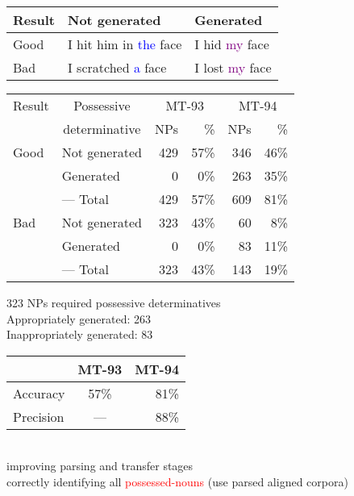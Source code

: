 \documentclass[a4paper,landscape,headrule,footrule,dvips]{foils}
\newcommand{\psp}[1]{\textcolor{purple}{#1}}
\newcommand{\dtr}[1]{\textcolor{blue}{#1}}
\newcommand{\trg}[1]{\textcolor{red}{#1}}
\newcommand{\hsp}{\hspace*{1.5cm}}
\newcommand{\hhsp}{\hspace*{2.5cm}}
\begin{document}
\begin{CJK}{UTF8}{min}
  \begin{center}
    \begin{tabular}{|l|l|l|} \hline
      Result & Not generated & Generated  \\ \hline
      Good &I hit him in \dtr{the} face  &  I hid \psp{my} face \\ \hline
      Bad &  I scratched \dtr{a} face       & I lost \psp{my} face \\ \hline
    \end{tabular}

    \begin{tabular}{|l|l|rr|rr|} \hline
      Result & \multicolumn{1}{c|}{Possessive}  &
      \multicolumn{2}{c|}{MT-93} & \multicolumn{2}{c|}{MT-94}\\ 
      & \multicolumn{1}{c|}{determinative}     & NPs & \%& NPs & \% \\ \hline
      Good & Not generated & 429 & 57\% & 346  & 46\%\\
      & Generated     &   0 & 0\%  & 263  & 35\%\\ \cline{2-6}
      & --- Total & 429 &  57\% & 609 & 81\%  \\ \hline
      Bad  & Not generated & 323 & 43\% &  60 & 8\% \\
      & Generated     &   0 & 0\%  &  83 & 11\% \\ \cline{2-6}
      & --- Total     &  323 & 43\% & 143 & 19\%  \\  \hline 
    \end{tabular}
  \end{center}


323 NPs required possessive determinatives \\
\hsp Appropriately generated: 263 \\
\hsp Inappropriately generated: 83

\hhsp \begin{tabular}{|l|c|r|} \hline
& \multicolumn{1}{c|}{MT-93} & \multicolumn{1}{c|}{MT-94}\\ \hline
Accuracy &  57\% &  81\% \\ \hline
Precision & --- &  88\% \\ \hline
\end{tabular}

 \\
\hsp improving parsing and transfer stages \\
\hsp correctly identifying all \trg{possessed-nouns} (use parsed aligned corpora)


\end{CJK}
\end{document}
